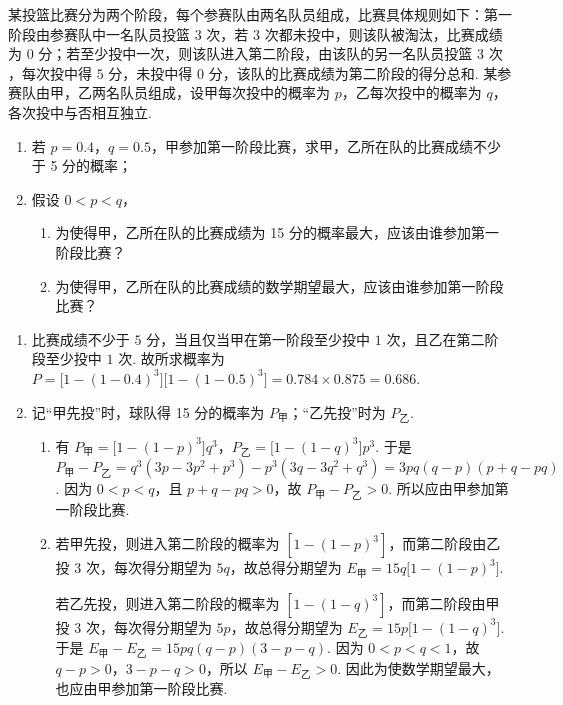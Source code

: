 \begin{problem}
某投篮比赛分为两个阶段，每个参赛队由两名队员组成，比赛具体规则如下：第一阶段由参赛队中一名队员投篮 \(3\text{ 次}\)，若 \(3\text{ 次}\)都未投中，则该队被淘汰，比赛成绩为 \(0\text{ 分}\)；若至少投中一次，则该队进入第二阶段，由该队的另一名队员投篮 \(3\text{ 次}\)，每次投中得 \(5\text{ 分}\)，未投中得 \(0\text{ 分}\)，该队的比赛成绩为第二阶段的得分总和. 某参赛队由甲，乙两名队员组成，设甲每次投中的概率为 \(p\)，乙每次投中的概率为 \(q\)，各次投中与否相互独立.
\begin{enumerate}
\item 若 \(p=0.4\)，\(q=0.5\)，甲参加第一阶段比赛，求甲，乙所在队的比赛成绩不少于 5 分的概率；
\item 假设 \(0<p<q\)，
\begin{enumerate}
\item 为使得甲，乙所在队的比赛成绩为 15 分的概率最大，应该由谁参加第一阶段比赛？
\item 为使得甲，乙所在队的比赛成绩的数学期望最大，应该由谁参加第一阶段比赛？
\end{enumerate}
\end{enumerate}
\end{problem}

\begin{solution}
\begin{enumerate}
\item 比赛成绩不少于 \(5\text{ 分}\)，当且仅当甲在第一阶段至少投中 \(1\) 次，且乙在第二阶段至少投中 \(1\) 次.
故所求概率为
\(P=\bigl[1-(1-0.4)^3\bigr]\bigl[1-(1-0.5)^3\bigr] =0.784\times 0.875 =0.686\).

\item 记“甲先投”时，球队得 15 分的概率为 \(P_{\text{甲}}\)；“乙先投”时为 \(P_{\text{乙}}\).
\begin{enumerate}
\item 有
\(P_{\text{甲}}=\bigl[1-(1-p)^3\bigr]q^3\)，\(P_{\text{乙}}=\bigl[1-(1-q)^3\bigr]p^3\).
于是
\(P_{\text{甲}}-P_{\text{乙}} =q^3(3p-3p^2+p^3)-p^3(3q-3q^2+q^3) =3pq(q-p)(p+q-pq)\).
因为 \(0<p<q\)，且 \(p+q-pq>0\)，故
\(P_{\text{甲}}-P_{\text{乙}}>0\).
所以应由甲参加第一阶段比赛.

\item 若甲先投，则进入第二阶段的概率为 \([1-(1-p)^3]\)，而第二阶段由乙投 \(3\) 次，每次得分期望为 \(5q\)，故总得分期望为
\(E_{\text{甲}}=15q\bigl[1-(1-p)^3\bigr]\).

若乙先投，则进入第二阶段的概率为 \([1-(1-q)^3]\)，而第二阶段由甲投 \(3\) 次，每次得分期望为 \(5p\)，故总得分期望为
\(E_{\text{乙}}=15p\bigl[1-(1-q)^3\bigr]\).
于是
\(E_{\text{甲}}-E_{\text{乙}} =15pq(q-p)(3-p-q)\).
因为 \(0<p<q<1\)，故 \(q-p>0\)，\(3-p-q>0\)，所以
\(E_{\text{甲}}-E_{\text{乙}}>0\).
因此为使数学期望最大，也应由甲参加第一阶段比赛.
\end{enumerate}
\end{enumerate}
\end{solution}

